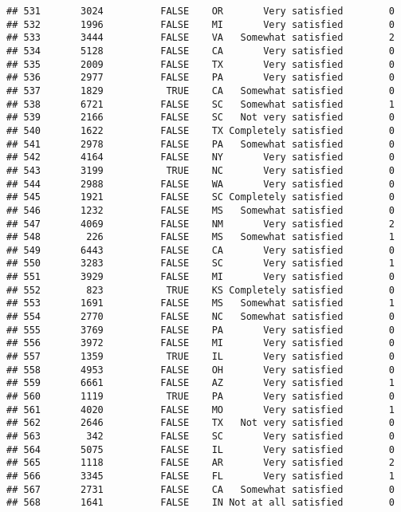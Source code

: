 \documentclass[]{book}
\theoremstyle{definition}
\theoremstyle{definition}
\theoremstyle{remark}
\begin{document}
\begin{verbatim}
## 531       3024          FALSE    OR       Very satisfied        0
## 532       1996          FALSE    MI       Very satisfied        0
## 533       3444          FALSE    VA   Somewhat satisfied        2
## 534       5128          FALSE    CA       Very satisfied        0
## 535       2009          FALSE    TX       Very satisfied        0
## 536       2977          FALSE    PA       Very satisfied        0
## 537       1829           TRUE    CA   Somewhat satisfied        0
## 538       6721          FALSE    SC   Somewhat satisfied        1
## 539       2166          FALSE    SC   Not very satisfied        0
## 540       1622          FALSE    TX Completely satisfied        0
## 541       2978          FALSE    PA   Somewhat satisfied        0
## 542       4164          FALSE    NY       Very satisfied        0
## 543       3199           TRUE    NC       Very satisfied        0
## 544       2988          FALSE    WA       Very satisfied        0
## 545       1921          FALSE    SC Completely satisfied        0
## 546       1232          FALSE    MS   Somewhat satisfied        0
## 547       4069          FALSE    NM       Very satisfied        2
## 548        226          FALSE    MS   Somewhat satisfied        1
## 549       6443          FALSE    CA       Very satisfied        0
## 550       3283          FALSE    SC       Very satisfied        1
## 551       3929          FALSE    MI       Very satisfied        0
## 552        823           TRUE    KS Completely satisfied        0
## 553       1691          FALSE    MS   Somewhat satisfied        1
## 554       2770          FALSE    NC   Somewhat satisfied        0
## 555       3769          FALSE    PA       Very satisfied        0
## 556       3972          FALSE    MI       Very satisfied        0
## 557       1359           TRUE    IL       Very satisfied        0
## 558       4953          FALSE    OH       Very satisfied        0
## 559       6661          FALSE    AZ       Very satisfied        1
## 560       1119           TRUE    PA       Very satisfied        0
## 561       4020          FALSE    MO       Very satisfied        1
## 562       2646          FALSE    TX   Not very satisfied        0
## 563        342          FALSE    SC       Very satisfied        0
## 564       5075          FALSE    IL       Very satisfied        0
## 565       1118          FALSE    AR       Very satisfied        2
## 566       3345          FALSE    FL       Very satisfied        1
## 567       2731          FALSE    CA   Somewhat satisfied        0
## 568       1641          FALSE    IN Not at all satisfied        0

\end{verbatim}
\end{document}
